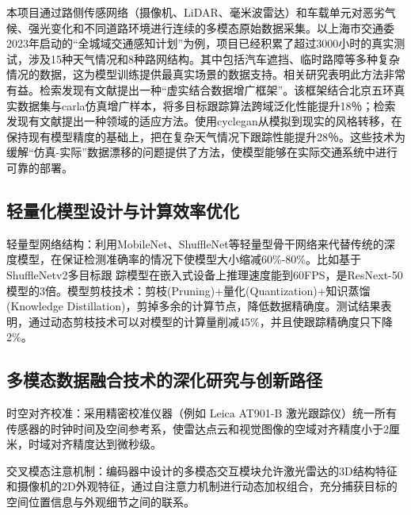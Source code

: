 本项目通过路侧传感网络（摄像机、LiDAR、毫米波雷达）和车载单元对恶劣气候、强光变化和不同道路环境进行连续的多模态原始数据采集。以上海市交通委2023年启动的“全城域交通感知计划”为例，项目已经积累了超过3000小时的真实测试，涉及15种天气情况和8种路网结构。其中包括汽车遮挡、临时路障等多种复杂情况的数据，这为模型训练提供最真实场景的数据支持。相关研究表明此方法非常有益。检索发现有文献\cite{tsinghua2022data}提出一种“虚实结合数据增广框架”。该框架结合北京五环真实数据集与carla仿真增广样本，将多目标跟踪算法跨域泛化性能提升18％；检索发现有文献\cite{chen2020adversarial}提出一种领域的适应方法。使用cyclegan从模拟到现实的风格转移，在保持现有模型精度的基础上，把在复杂天气情况下跟踪性能提升28％。这些技术为缓解“仿真-实际”数据漂移的问题提供了方法，使模型能够在实际交通系统中进行可靠的部署。







\subsection{轻量化模型设计与计算效率优化}



轻量型网络结构：利用MobileNet、ShuffleNet等轻量型骨干网络来代替传统的深度模型，在保证检测准确率的情况下使模型大小缩减60\%-80\%。比如基于ShuffleNetv2多目标跟  踪模型在嵌入式设备上推理速度能到60FPS，是ResNext-50模型的3倍\cite{casia2023lightweight}。模型剪枝技术：剪枝(Pruning)+量化(Quantization)+知识蒸馏(Knowledge Distillation)，剪掉多余的计算节点，降低数据精确度。测试结果表明，通过动态剪枝技术可以对模型的计算量削减45\%，并且使跟踪精确度只下降2\%\cite{li2021lighttrack}。



\subsection{多模态数据融合技术的深化研究与创新路径}


时空对齐校准：采用精密校准仪器（例如 Leica AT901-B 激光跟踪仪）统一所有传感器的时钟时间及空间参考系，使雷达点云和视觉图像的空域对齐精度小于2厘米，时域对齐精度达到微秒级\cite{tsinghua2022calibration}。

交叉模态注意机制：编码器中设计的多模态交互模块允许激光雷达的3D结构特征和摄像机的2D外观特征，通过自注意力机制进行动态加权组合，充分捕获目标的空间位置信息与外观细节之间的联系\cite{peterson2021transformer}。





